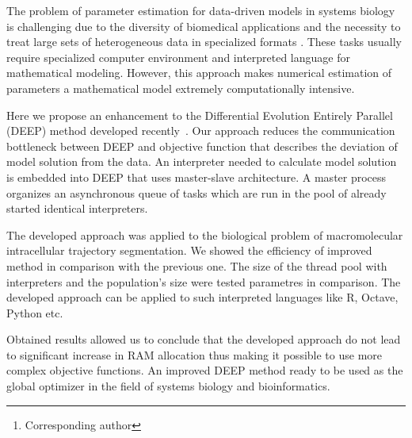 \documentclass[12pt, a4paper]{article} %
\begin{document}

\renewcommand{\abstractname}{\large \textbf{\uppercase{
    Deep: optimizer with embedded interpreter\\
}}}
\begin{abstract}
    \normalsize %
    \bigskip %
    \noindent A.~V.~Svichkarev\footnote[*]{Corresponding author}, K.~N.~Kozlov \\
    \noindent
    System biology and bioinformatics lab, IAMM,
    Peter the Great St.Petersburg Polytechnic University,
St.Petersburg, Russia \\
    \noindent e-mail: tolik0393@bionet.nsc.ru \\
\end{abstract}

The problem of parameter estimation
for data-driven models in systems biology
is challenging due to the diversity
of biomedical applications and
the necessity to treat large sets of
heterogeneous data in specialized formats \cite{mendes1998non}.
These tasks usually require
specialized computer environment
and interpreted language for
mathematical modeling.
However, this approach makes
numerical estimation of parameters
a mathematical model
extremely computationally intensive.

Here we propose
an enhancement to the
Differential Evolution Entirely Parallel (DEEP) method
developed recently~\cite{Kozlov11}.
Our approach reduces the
communication bottleneck
between DEEP and objective function
that describes the deviation
of model solution
from the data.
An interpreter needed to
calculate model solution
is embedded into
DEEP that uses
master-slave architecture.
A master process
organizes an asynchronous queue
of tasks which are run
in the pool of
already started identical interpreters.

The developed approach was
applied to the biological problem
of macromolecular intracellular
trajectory segmentation.
We showed the efficiency of improved method
in comparison with the previous one.
The size of the thread pool
with interpreters and
the population's size
were tested parametres
in comparison.
The developed approach can be applied to
such interpreted languages like
R, Octave, Python etc.

Obtained results allowed us
to conclude that
the developed approach
do not lead to significant increase
in RAM allocation thus making
it possible to use
more complex objective functions.
An improved DEEP method ready
to be used as the global optimizer
in the field of systems biology
and bioinformatics.

\vfill %
\end{document}
